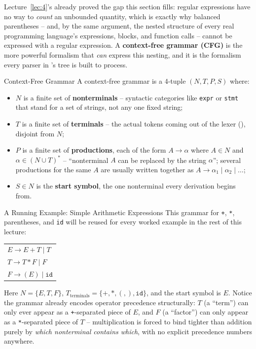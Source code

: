 \documentclass[full-course-notes.tex]{subfiles}
\begin{document}
\dbtag Lecture~\ref{lec:4}'s  already proved the gap this
section fills: regular expressions have no way to \emph{count} an unbounded quantity, which is
exactly why balanced parentheses -- and, by the same argument, the nested structure of every
real programming language's expressions, blocks, and function calls -- cannot be expressed with
a regular expression. A \textbf{context-free grammar (CFG)} is the more powerful formalism that
\emph{can} express this nesting, and it is the formalism every parser in
's tree is built to process.

\begin{defbox}{Context-Free Grammar}
A context-free grammar is a 4-tuple $(N, T, P, S)$ where:
\begin{itemize}
  \item $N$ is a finite set of \textbf{nonterminals} -- syntactic categories like
  \texttt{expr} or \texttt{stmt} that stand for a set of strings, not any one fixed string;
  \item $T$ is a finite set of \textbf{terminals} -- the actual tokens coming out of the lexer
  (), disjoint from $N$;
  \item $P$ is a finite set of \textbf{productions}, each of the form $A \to \alpha$ where
  $A \in N$ and $\alpha \in (N \cup T)^{*}$ -- ``nonterminal $A$ can be replaced by the string
  $\alpha$''; several productions for the same $A$ are usually written together as
  $A \to \alpha_1 \mid \alpha_2 \mid \dots$;
  \item $S \in N$ is the \textbf{start symbol}, the one nonterminal every derivation begins
  from.
\end{itemize}
\end{defbox}

\begin{examplebox}{A Running Example: Simple Arithmetic Expressions}
This grammar for \texttt{+}, \texttt{*}, parentheses, and \texttt{id} will be reused for every
worked example in the rest of this lecture:
\begin{center}
\ttfamily
\begin{tabular}{@{}l@{}}
$E \to E + T \mid T$ \\
$T \to T * F \mid F$ \\
$F \to ( E ) \mid \texttt{id}$
\end{tabular}
\end{center}
Here $N = \{E, T, F\}$, $T_{\text{terminals}} = \{\texttt{+}, \texttt{*}, (, ), \texttt{id}\}$,
and the start symbol is $E$. Notice the grammar already encodes operator precedence
structurally: $T$ (a ``term'') can only ever appear as a \texttt{+}-separated piece of $E$, and
$F$ (a ``factor'') can only appear as a \texttt{*}-separated piece of $T$ -- multiplication is
forced to bind tighter than addition purely by \emph{which nonterminal contains which}, with no
explicit precedence numbers anywhere.
\end{examplebox}
\end{document}
